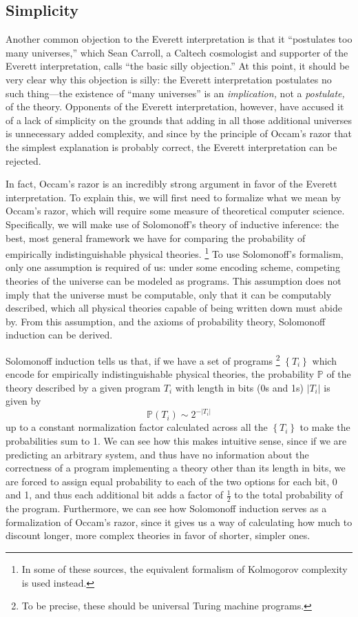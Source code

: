 \documentclass[
    12pt,
    letterpaper,
    aps,
    prd,
    longbibliography,
    twocolumn,
    nofootinbib,
    raggedbottom,
    amsmath,
    amssymb,
    amsfonts,
]{revtex4-1}
\newcommand{\abs}[1]{\left|#1\right|}
\newcommand{\set}[1]{\left\{#1\right\}}
\newcommand{\mbb}[1]{\mathbb{#1}}
\let\origfootnote\footnote
\renewcommand{\footnote}[1]{%
   \begingroup%
   \renewcommand{\footnotesize}{\fontsize{10pt}{8pt}\selectfont}%
   \origfootnote{#1}%
   \endgroup%
}
\begin{document}
\subsection{Simplicity}
\label{sec:simp}

Another common objection to the Everett interpretation is that it ``postulates too many universes,'' which Sean Carroll, a Caltech cosmologist and supporter of the Everett interpretation, calls ``the basic silly objection.''\cite{carroll} At this point, it should be very clear why this objection is silly: the Everett interpretation postulates no such thing---the existence of ``many universes'' is an \textit{implication,} not a \textit{postulate,} of the theory. Opponents of the Everett interpretation, however, have accused it of a lack of simplicity on the grounds that adding in all those additional universes is unnecessary added complexity, and since by the principle of Occam's razor that the simplest explanation is probably correct, the Everett interpretation can be rejected.\cite{badoccam}

In fact, Occam's razor is an incredibly strong argument in favor of the Everett interpretation. To explain this, we will first need to formalize what we mean by Occam's razor, which will require some measure of theoretical computer science. Specifically, we will make use of Solomonoff's theory of inductive inference: the best, most general framework we have for comparing the probability of empirically indistinguishable physical theories.\cite{solomonoff}\cite{occam}\cite{lesswrongsolomonoff}\footnote{In some of these sources, the equivalent formalism of Kolmogorov complexity is used instead.} To use Solomonoff's formalism, only one assumption is required of us: under some encoding scheme, competing theories of the universe can be modeled as programs. This assumption does not imply that the universe must be computable, only that it can be computably described, which all physical theories capable of being written down must abide by. From this assumption, and the axioms of probability theory, Solomonoff induction can be derived.\cite{solomonoff}

Solomonoff induction tells us that, if we have a set of programs\footnote{To be precise, these should be universal Turing machine programs.} $\set{T_i}$ which encode for empirically indistinguishable physical theories, the probability $\mbb P$ of the theory described by a given program $T_i$ with length in bits (0s and 1s) $\abs{T_i}$ is given by
\[
    \mbb P(T_i) \sim 2^{-\abs{T_i}}
\]
up to a constant normalization factor calculated across all the $\set{T_i}$ to make the probabilities sum to 1.\cite{solomonoff} We can see how this makes intuitive sense, since if we are predicting an arbitrary system, and thus have no information about the correctness of a program implementing a theory other than its length in bits, we are forced to assign equal probability to each of the two options for each bit, 0 and 1, and thus each additional bit adds a factor of $\frac{1}{2}$ to the total probability of the program. Furthermore, we can see how Solomonoff induction serves as a formalization of Occam's razor, since it gives us a way of calculating how much to discount longer, more complex theories in favor of shorter, simpler ones.
\end{document}
